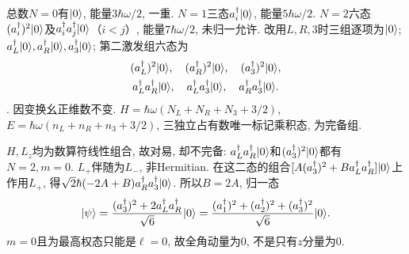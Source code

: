 \begin{solution}
总数$N=0$有$\lvert 0\rangle$, 能量$3\hbar\omega/2$, 一重. $N=1$三态$a_i^\dagger\lvert 0\rangle$, 能量$5\hbar\omega/2$. $N=2$六态$(a_i^\dagger)^2\lvert 0\rangle$及$a_i^\dagger a_j^\dagger\lvert 0\rangle$（$i<j$）, 能量$7\hbar\omega/2$, 未归一允许. 改用$L,R,3$时三组逐项为$\lvert 0\rangle$; $a_L^\dagger\lvert 0\rangle,a_R^\dagger\lvert 0\rangle,a_3^\dagger\lvert 0\rangle$; 第二激发组六态为
\[
\begin{gathered}
(a_L^\dagger)^2\lvert 0\rangle,\quad(a_R^\dagger)^2\lvert 0\rangle,\quad(a_3^\dagger)^2\lvert 0\rangle,\\
a_L^\dagger a_R^\dagger\lvert 0\rangle,\quad a_L^\dagger a_3^\dagger\lvert 0\rangle,\quad a_R^\dagger a_3^\dagger\lvert 0\rangle.
\end{gathered}
\]. 因变换幺正维数不变. $H=\hbar\omega(N_L+N_R+N_3+3/2)$,$E=\hbar\omega(n_L+n_R+n_3+3/2)$, 三独立占有数唯一标记乘积态, 为完备组.

$H,L_z$均为数算符线性组合, 故对易, 却不完备: $a_L^\dagger a_R^\dagger\lvert 0\rangle$和$(a_3^\dagger)^2\lvert 0\rangle$都有$N=2,m=0$. $L_+$伴随为$L_-$, 非Hermitian. 在这二态的组合$[A(a_3^\dagger)^2+B a_L^\dagger a_R^\dagger]\lvert 0\rangle$上作用$L_+$, 得$\sqrt2\hbar(-2A+B)a_R^\dagger a_3^\dagger\lvert 0\rangle$. 所以$B=2A$, 归一态
\[
\lvert \psi\rangle=\frac{(a_3^\dagger)^2+2a_L^\dagger a_R^\dagger}{\sqrt6}\lvert 0\rangle
=\frac{(a_1^\dagger)^2+(a_2^\dagger)^2+(a_3^\dagger)^2}{\sqrt6}\lvert 0\rangle.
\]
$m=0$且为最高权态只能是$\ell=0$, 故全角动量为0, 不是只有$z$分量为0.
\end{solution}
